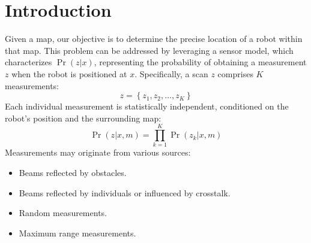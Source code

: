 \section{Introduction}

Given a map, our objective is to determine the precise location of a robot within that map.
This problem can be addressed by leveraging a sensor model, which characterizes $\Pr(z|x)$, representing the probability of obtaining a measurement $z$ when the robot is positioned at $x$.
Specifically, a scan $z$ comprises $K$ measurements:
\[z=\left\{ z_1,z_2,\dots,z_K \right\}\]
Each individual measurement is statistically independent, conditioned on the robot's position and the surrounding map:
\[\Pr(z|x,m)=\prod_{k=1}^{K}\Pr(z_k|x,m)\]
Measurements may originate from various sources:
\begin{itemize}
    \item Beams reflected by obstacles.
    \item Beams reflected by individuals or influenced by crosstalk.
    \item Random measurements.
    \item Maximum range measurements.
\end{itemize}